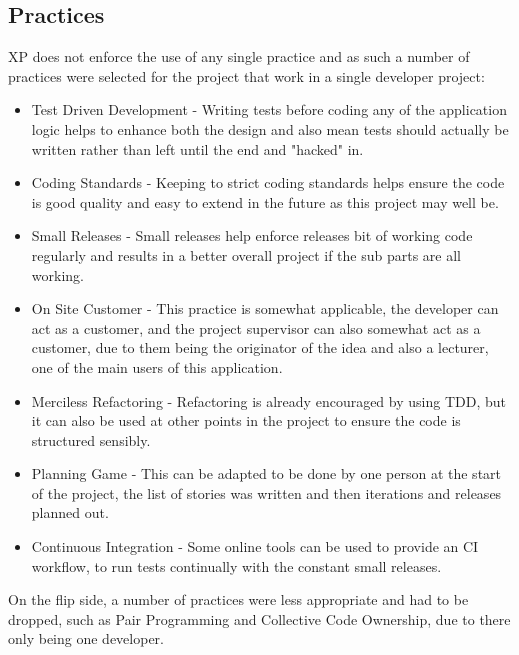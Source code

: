 \subsection{Practices}
XP does not enforce the use of any single practice and as such a number of practices were selected for the project that work in a single developer project:
\begin{itemize}
	\item Test Driven Development - Writing tests before coding any of the application logic helps to enhance both the design and also mean tests should actually be written rather than left until the end and "hacked" in.
	\item Coding Standards - Keeping to strict coding standards helps ensure the code is good quality and easy to extend in the future as this project may well be.
	\item Small Releases - Small releases help enforce releases bit of working code regularly and results in a better overall project if the sub parts are all working.
	\item On Site Customer - This practice is somewhat applicable, the developer can act as a customer, and the project supervisor can also somewhat act as a customer, due to them being the originator of the idea and also a lecturer, one of the main users of this application.
	\item Merciless Refactoring - Refactoring is already encouraged by using TDD, but it can also be used at other points in the project to ensure the code is structured sensibly.
	\item Planning Game - This can be adapted to be done by one person at the start of the project, the list of stories was written and then iterations and releases planned out.
	\item Continuous Integration - Some online tools can be used to provide an CI workflow, to run tests continually with the constant small releases.
\end{itemize}

On the flip side, a number of practices were less appropriate and had to be dropped, such as Pair Programming and Collective Code Ownership, due to there only being one developer.

